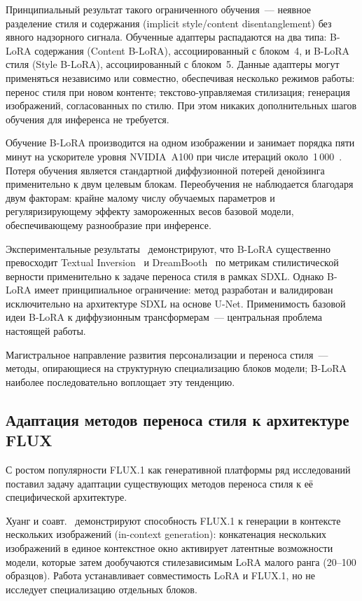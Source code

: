 Принципиальный результат такого ограниченного обучения~--- неявное разделение стиля и содержания (implicit style/content disentanglement) без явного надзорного сигнала. Обученные адаптеры распадаются на два типа: B-LoRA содержания (Content B-LoRA), ассоциированный с блоком~4, и B-LoRA стиля (Style B-LoRA), ассоциированный с блоком~5. Данные адаптеры могут применяться независимо или совместно, обеспечивая несколько режимов работы: перенос стиля при новом контенте; текстово-управляемая стилизация; генерация изображений, согласованных по стилю. При этом никаких дополнительных шагов обучения для инференса не требуется.

Обучение B-LoRA производится на одном изображении и занимает порядка пяти минут на ускорителе уровня NVIDIA~A100 при числе итераций около~1\,000~\cite{frenkel2024blora}. Потеря обучения является стандартной диффузионной потерей денойзинга применительно к двум целевым блокам. Переобучения не наблюдается благодаря двум факторам: крайне малому числу обучаемых параметров и регуляризирующему эффекту замороженных весов базовой модели, обеспечивающему разнообразие при инференсе.

Экспериментальные результаты~\cite{frenkel2024blora} демонстрируют, что B-LoRA существенно превосходит Textual Inversion~\cite{gal2023textualinversion} и DreamBooth~\cite{ruiz2023dreambooth} по метрикам стилистической верности применительно к задаче переноса стиля в рамках SDXL. Однако B-LoRA имеет принципиальное ограничение: метод разработан и валидирован исключительно на архитектуре SDXL на основе U-Net. Применимость базовой идеи B-LoRA к диффузионным трансформерам~--- центральная проблема настоящей работы.

Магистральное направление развития персонализации и переноса стиля~--- методы, опирающиеся на структурную специализацию блоков модели; B-LoRA наиболее последовательно воплощает эту тенденцию.


\subsection{Адаптация методов переноса стиля к архитектуре FLUX}

С ростом популярности FLUX.1 как генеративной платформы ряд исследований поставил задачу адаптации существующих методов переноса стиля к её специфической архитектуре.

Хуанг и соавт.~\cite{huang2024iclora} демонстрируют способность FLUX.1 к генерации в контексте нескольких изображений (in-context generation): конкатенация нескольких изображений в единое контекстное окно активирует латентные возможности модели, которые затем дообучаются стилезависимым LoRA малого ранга (20--100 образцов). Работа устанавливает совместимость LoRA и FLUX.1, но не исследует специализацию отдельных блоков.


